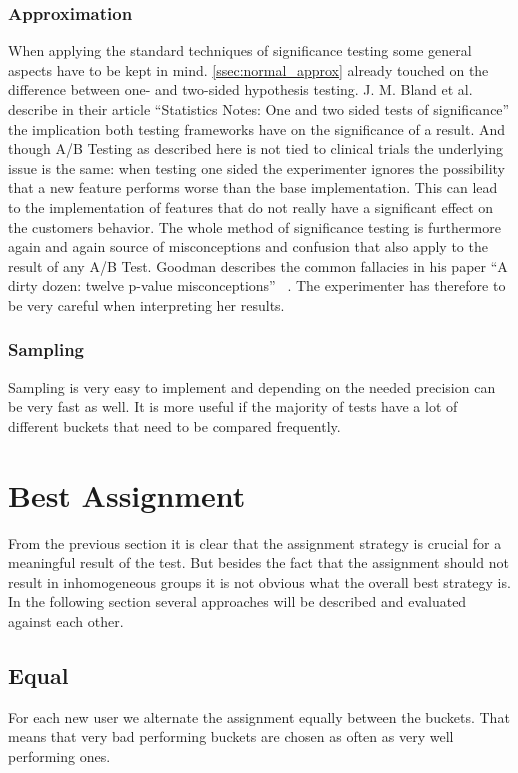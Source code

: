 \documentclass[../Thesis.tex]{subfiles}
\begin{document}
\subsubsection{Approximation}
When applying the standard techniques of significance testing some general aspects have to be kept in mind. \ref{ssec:normal_approx} already touched on the difference between one- and two-sided hypothesis testing. J. M. Bland et al.~\cite{bland1994statistics} describe in their article ``Statistics Notes: One and two sided tests of significance'' the implication both testing frameworks have on the significance of a result. And though A/B Testing as described here is not tied to clinical trials the underlying issue is the same: when testing one sided the experimenter ignores the possibility that a new feature performs worse than the base implementation. This can lead to the implementation of features that do not really have a significant effect on the customers behavior.
The whole method of significance testing is furthermore again and again source of misconceptions and confusion that also apply to the result of any A/B Test. Goodman describes the common fallacies in his paper ``A dirty dozen: twelve p-value misconceptions'' ~\cite{goodman2008dirty}. The experimenter has therefore to be very careful when interpreting her results.

\subsubsection{Sampling}
Sampling is very easy to implement and depending on the needed precision can be very fast as well. It is more useful if the majority of tests have a lot of different buckets that need to be compared frequently.

\section{Best Assignment}
From the previous section it is clear that the assignment strategy is crucial for a meaningful result of the test. But besides the fact that the assignment should not result in inhomogeneous groups it is not obvious what the overall best strategy is. In the following section several approaches will be described and evaluated against each other.

\subsection{Equal}
For each new user we alternate the assignment equally between the buckets. That means that very bad performing buckets are chosen as often as very well performing ones.
\end{document}

